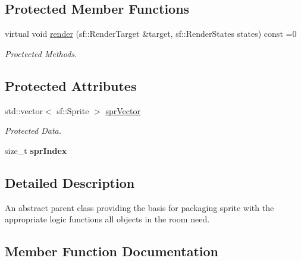 \subsection*{Protected Member Functions}
\begin{DoxyCompactItemize}
\item 
virtual void \hyperlink{class_helios_1_1_spr_obj_a4cfc26ae9779c15ae4db84e5736cb6b1}{render} (sf\+::\+Render\+Target \&target, sf\+::\+Render\+States states) const  =0
\begin{DoxyCompactList}\small\item\em Proctected Methods. \end{DoxyCompactList}\end{DoxyCompactItemize}
\subsection*{Protected Attributes}
\begin{DoxyCompactItemize}
\item 
\hypertarget{class_helios_1_1_spr_obj_ac9b20866be4703e1285b1b75e2e08490}{}std\+::vector$<$ sf\+::\+Sprite $>$ \hyperlink{class_helios_1_1_spr_obj_ac9b20866be4703e1285b1b75e2e08490}{spr\+Vector}\label{class_helios_1_1_spr_obj_ac9b20866be4703e1285b1b75e2e08490}

\begin{DoxyCompactList}\small\item\em Protected Data. \end{DoxyCompactList}\item 
\hypertarget{class_helios_1_1_spr_obj_a5a5099d52e40625858912ed29c519c59}{}size\+\_\+t {\bfseries spr\+Index}\label{class_helios_1_1_spr_obj_a5a5099d52e40625858912ed29c519c59}

\end{DoxyCompactItemize}


\subsection{Detailed Description}
An abstract parent class providing the basis for packaging sprite with the appropriate logic functions all objects in the room need. 

\subsection{Member Function Documentation}
\hypertarget{class_helios_1_1_spr_obj_a4cfc26ae9779c15ae4db84e5736cb6b1}{}
